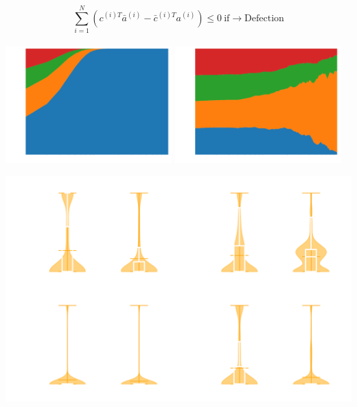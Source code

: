 \documentclass{beamer}
\begin{document}
\begin{frame}
    \begin{center}
    \[\sum_{i=1} ^ N (c^{(i)T} \bar{a}^{(i)} - \bar{c}^{(i)T} a^{(i)}) \leq 0 \ \text{if} \rightarrow \text{Defection}\] \\ \vspace{.5cm}
    \pause
    \includegraphics[width=0.48\textwidth]{static/population_defection_takes_over.png}\hspace{6pt}
    \includegraphics[width=0.48\textwidth]{static/population_defection_fails.png}\vspace{10pt}

    \end{center}
\end{frame}


\begin{frame}
    \begin{center}
    
    \end{center}
\end{frame}

\begin{frame}
    \begin{center}
    \includegraphics[width=.8\textwidth]{static/mem_one_violin.png}
    \end{center}
\end{frame}
\end{document}
